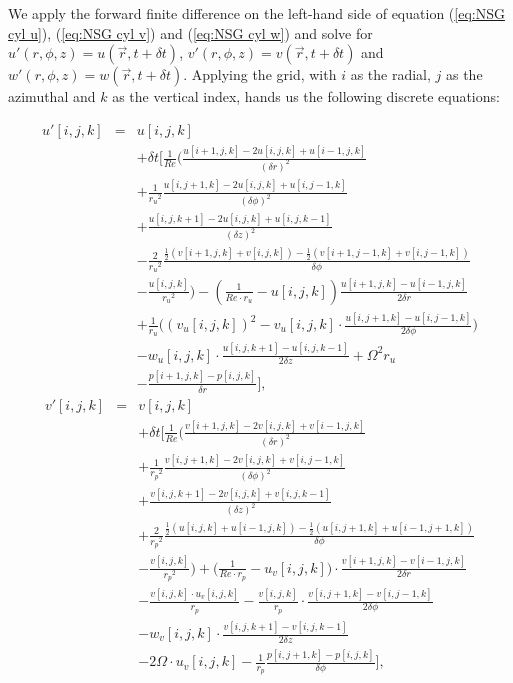 \documentclass[12pt, a4paper]{article} %
\begin{document}
			We apply the forward finite difference on the left-hand side of equation (\ref{eq:NSG cyl u}), (\ref{eq:NSG cyl v}) and (\ref{eq:NSG cyl w}) and solve for $u'(r,\phi,z) = u(\vec{r}, t+\delta t)$, $v'(r,\phi,z) = v(\vec{r}, t+\delta t)$ and $w'(r,\phi,z) = w(\vec{r}, t+\delta t)$. Applying the grid, with $i$ as the radial, $j$ as the azimuthal and $k$ as the vertical index, hands us the following discrete equations:
			
			\begin{eqnarray}
				u'[i,j,k] &=& u[i,j,k]	\nonumber \\
				&& +\delta t \Bigg[\frac{1}{Re}\bigg(\frac{u[i+1,j,k]-2u[i,j,k]+u[i-1,j,k]}{(\delta r)^2}	\nonumber \\
				&& + \frac{1}{{r_u}^2}\frac{u[i,j+1,k]-2u[i,j,k]+u[i,j-1,k]}{(\delta \phi)^2}	\nonumber \\
				&& + \frac{u[i,j,k+1] - 2u[i,j,k] +u[i,j,k-1]}{(\delta z)^2}	\nonumber \\
				&& - \frac{2}{{r_u}^2}\frac{\frac{1}{2}\left(v[i+1,j,k]+v[i,j,k]\right)-\frac{1}{2}\left(v[i+1,j-1,k]+v[i,j-1,k]\right)}{\delta \phi}	\nonumber \\
				&& - \frac{u[i,j,k]}{{r_u}^2}\bigg) - \left(\frac{1}{Re\cdot r_u} - u[i,j,k]\right)\frac{u[i+1,j,k]-u[i-1,j,k]}{2\delta r}	\nonumber \\
				&& + \frac{1}{r_u}\bigg(\left(v_u[i,j,k]\right)^2 - v_u[i,j,k] \cdot \frac{u[i,j+1,k]-u[i,j-1,k]}{2\delta \phi}\bigg)	\nonumber \\
				&& - w_u[i,j,k] \cdot \frac{u[i,j,k+1]-u[i,j,k-1]}{2\delta z} + \Omega^2 r_u	\nonumber \\
				&& - \frac{p[i+1,j,k]-p[i,j,k]}{\delta r} \Bigg] ,
				\label{eq:Discrete u}
			\end{eqnarray}
			\begin{eqnarray}
				v'[i,j,k] &=& v[i,j,k]	\nonumber \\
				&& + \delta t \Bigg[ \frac{1}{Re} \bigg( \frac{v[i+1,j,k]-2 v[i,j,k]+v[i-1,j,k]}{(\delta r)^2}	\nonumber \\
				&& + \frac{1}{{r_p}^2} \frac{v[i,j+1,k]-2v[i,j,k]+v[i,j-1,k]}{(\delta \phi)^2}	\nonumber \\
				&& + \frac{v[i,j,k+1]-2v[i,j,k]+v[i,j,k-1]}{(\delta z)^2}	\nonumber \\
				&& + \frac{2}{{r_p}^2} \frac{\frac{1}{2}\left(u[i,j,k]+u[i-1,j,k]\right)-\frac{1}{2}\left(u[i,j+1,k]+u[i-1,j+1,k]\right)}{\delta\phi} \nonumber \\
				&& - \frac{v[i,j,k]}{{r_p}^2} \bigg) + \bigg( \frac{1}{Re\cdot r_p} - u_v[i,j,k] \bigg) \cdot \frac{v[i+1,j,k]-v[i-1,j,k]}{2\delta r} \nonumber \\
				&& - \frac{v[i,j,k] \cdot u_v[i,j,k]}{r_p} - \frac{v[i,j,k]}{r_p}\cdot \frac{v[i,j+1,k]-v[i,j-1,k]}{2\delta \phi} \nonumber \\
				&& - w_v[i,j,k] \cdot \frac{v[i,j,k+1]-v[i,j,k-1]}{2\delta z} \nonumber \\
				&& - 2\Omega\cdot u_v[i,j,k] - \frac{1}{r_p} \frac{p[i,j+1,k]-p[i,j,k]}{\delta \phi}
				\Bigg] ,
				\label{eq:Discrete v}
			\end{eqnarray}
						
\end{document}
